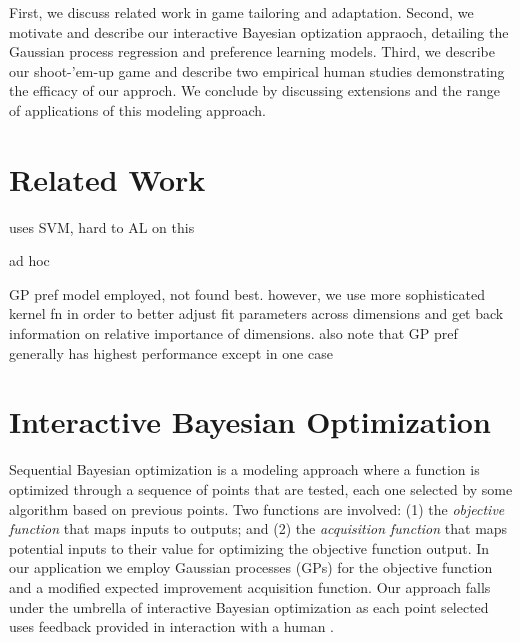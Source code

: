 \documentclass[letterpaper]{article}
\begin{document}

First, we discuss related work in game tailoring and adaptation. Second, we motivate and describe our interactive Bayesian optization appraoch, detailing the Gaussian process regression and preference learning models. Third, we describe our shoot-'em-up game and describe two empirical human studies demonstrating the efficacy of our approch. We conclude by discussing extensions and the range of applications of this modeling approach.


\section{Related Work}

\cite{yu2011:minboredom} uses SVM, hard to AL on this

\cite{hunicke2004:dda} ad hoc

\cite{yannakakis2009:gameadapt} \cite{yannakakis2009:playermodel} GP pref model employed, not found best. however, we use more sophisticated kernel fn in order to better adjust fit parameters across dimensions and get back information on relative importance of dimensions. also note that GP pref generally has highest performance except in one case

\cite{bakkes2012}

\section{Interactive Bayesian Optimization}
Sequential Bayesian optimization is a modeling approach where a function is optimized through a sequence of points that are tested, each one selected by some algorithm based on previous points. Two functions are involved: (1) the \textit{objective function} that maps inputs to outputs; and (2) the \textit{acquisition function} that maps potential inputs to their value for optimizing the objective function output. In our application we employ Gaussian processes (GPs) for the objective function and a modified expected improvement acquisition function. Our approach falls under the umbrella of interactive Bayesian optimization as each point selected uses feedback provided in interaction with a human \cite{brochu2010:thesis}.
\end{document}
